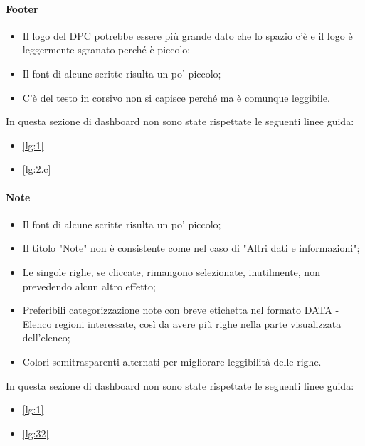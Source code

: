 \paragraph{Footer}
\begin{itemize}
    \item Il logo del DPC potrebbe essere più grande dato che lo spazio c'è e il logo è leggermente sgranato perché è piccolo;
    \item Il font di alcune scritte risulta un po' piccolo;
    \item C'è del testo in corsivo non si capisce perché ma è comunque leggibile.
\end{itemize}
In questa sezione di dashboard non sono state rispettate le seguenti linee guida:
\begin{itemize}
    \item \ref{lg:1}
    \item \ref{lg:2.c}
\end{itemize}

\paragraph{Note}
\begin{itemize}
    \item Il font di alcune scritte risulta un po' piccolo;
    \item Il titolo "Note" non è consistente come nel caso di "Altri dati e informazioni";
    \item Le singole righe, se cliccate, rimangono selezionate, inutilmente, non prevedendo alcun altro effetto;
    \item Preferibili categorizzazione note con breve etichetta nel formato DATA - Elenco regioni interessate, così da avere più righe nella parte visualizzata dell'elenco;
    \item Colori semitrasparenti alternati per migliorare leggibilità delle righe.
\end{itemize}
In questa sezione di dashboard non sono state rispettate le seguenti linee guida:
\begin{itemize}
    \item \ref{lg:1}
    \item \ref{lg:32}
\end{itemize}

